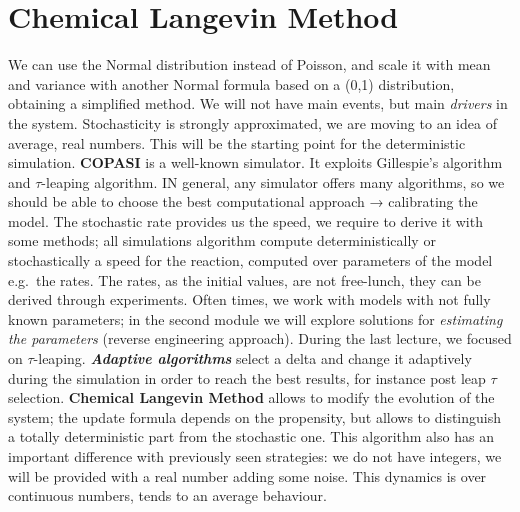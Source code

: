 \section{\texorpdfstring{\textbf{Chemical Langevin Method}}{Chemical Langevin Method}}
We can use the Normal distribution instead of Poisson, and scale it with mean and variance with another Normal formula based on a (0,1) distribution, obtaining a simplified method.
We will not have main events, but main \emph{drivers} in the system.
Stochasticity is strongly approximated, we are moving to an idea of average, real numbers.
This will be the starting point for the deterministic simulation.
\textbf{COPASI} is a well-known simulator.
It exploits Gillespie's algorithm and $\tau$-leaping algorithm.
IN general, any simulator offers many algorithms, so we should be able to choose the best computational approach → calibrating the model.
The stochastic rate provides us the speed, we require to derive it with some methods; all simulations algorithm compute deterministically or stochastically a speed for the reaction, computed over parameters of the model e.g.~the rates.
The rates, as the initial values, are not free-lunch, they can be derived through experiments.
Often times, we work with models with not fully known parameters; in the second module we will explore solutions for \emph{estimating the parameters} (reverse engineering approach).
During the last lecture, we focused on $\tau$-leaping.
\textbf{\emph{Adaptive algorithms}} select a delta and change it adaptively during the simulation in order to reach the best results, for instance post leap $\tau$ selection.
\textbf{Chemical Langevin Method} allows to modify the evolution of the system; the update formula depends on the propensity, but allows to distinguish a totally deterministic part from the stochastic one.
This algorithm also has an important difference with previously seen strategies: we do not have integers, we will be provided with a real number adding some noise.
This dynamics is over continuous numbers, tends to an average behaviour.

